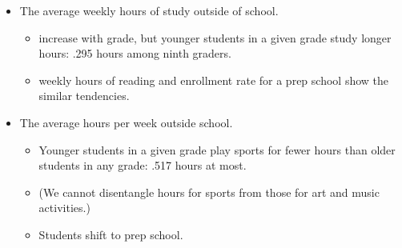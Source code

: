 \documentclass[../root]{subfiles}
\begin{document}
    \begin{itemize}
      \item The average weekly hours of study outside of school.
      \begin{itemize}
        \item increase with grade, but younger students in a given grade study longer hours: .295 hours among ninth graders.
        \item weekly hours of reading and enrollment rate for a prep school show the similar tendencies.
      \end{itemize}
      \item The average hours per week outside school.
      \begin{itemize}
        \item Younger students in a given grade play sports for fewer hours than older students in any grade: .517 hours at most.
        \item (We cannot disentangle hours for sports from those for art and music activities.)
        \item Students shift to prep school.
      \end{itemize}
    \end{itemize}
\end{document}
